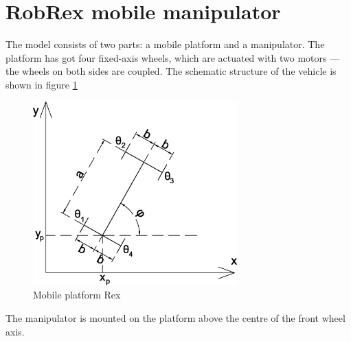 \section{RobRex mobile manipulator}
The model consists of two parts: a mobile platform and a manipulator. The platform has got four
fixed-axis wheels, which are actuated with two motors --- the wheels on both sides are coupled.
The schematic structure of the vehicle is shown in figure \ref{fig:robrex_sch}
\begin{figure}
\centering
\includegraphics[width=0.7\textwidth]{img/robrex.eps}
\caption{Mobile platform Rex}
\label{fig:robrex_sch}
\end{figure}
The manipulator is mounted on the platform above the centre of the front wheel axis.
